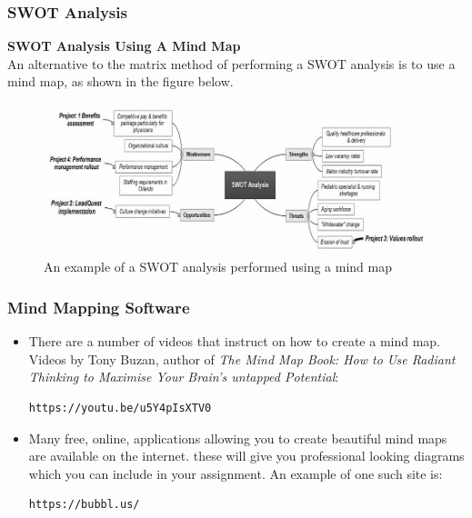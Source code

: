\documentclass{beamer}
\begin{document}
\begin{frame}
\frametitle{SWOT Analysis}
\textbf{SWOT Analysis Using A Mind Map}\\
An alternative to the matrix method of performing a SWOT analysis is to use a mind map, as shown in the figure below.
\begin{figure}
\includegraphics[scale=0.5]{swot_mind_map}
\caption{An example of a SWOT analysis performed using a mind map}
\end{figure}
\end{frame}

\begin{frame}[fragile]
\frametitle{Mind Mapping Software}
\begin{itemize}
\item There are a number of videos that instruct on how to create a mind map. Videos by Tony Buzan, author of \textit{The Mind Map Book: How to Use Radiant Thinking to Maximise Your Brain's untapped Potential}:\\
\begin{center}
\begin{verbatim}https://youtu.be/u5Y4pIsXTV0\end{verbatim}
\end{center}
\vspace{0.5cm}
\item Many free, online, applications allowing you to create beautiful mind maps are available on the internet. these will give you professional looking diagrams which you can include in your assignment. An example of one such site is:\\
\begin{center}
\begin{verbatim}https://bubbl.us/\end{verbatim}
\end{center}
\end{itemize}
\end{frame}
\end{document}
